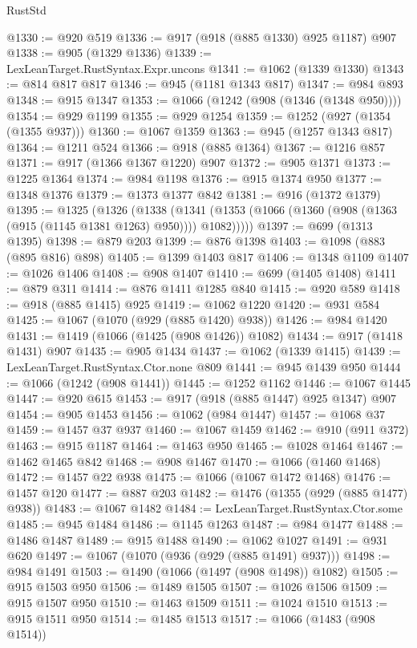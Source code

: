 \begin{lexlean}{RustStd}
\begin{coremodule}
@1330 := @920 @519
@1336 := @917 (@918 (@885 @1330) @925 @1187) @907
@1338 := @905 (@1329 @1336)
@1339 := LexLeanTarget.RustSyntax.Expr.uncons
@1341 := @1062 (@1339 @1330)
@1343 := @814 @817 @817
@1346 := @945 (@1181 @1343 @817)
@1347 := @984 @893
@1348 := @915 @1347
@1353 := @1066 (@1242 (@908 (@1346 (@1348 @950))))
@1354 := @929 @1199
@1355 := @929 @1254
@1359 := @1252 (@927 (@1354 (@1355 @937)))
@1360 := @1067 @1359
@1363 := @945 (@1257 @1343 @817)
@1364 := @1211 @524
@1366 := @918 (@885 @1364)
@1367 := @1216 @857
@1371 := @917 (@1366 @1367 @1220) @907
@1372 := @905 @1371
@1373 := @1225 @1364
@1374 := @984 @1198
@1376 := @915 @1374 @950
@1377 := @1348 @1376
@1379 := @1373 @1377 @842
@1381 := @916 (@1372 @1379)
@1395 := @1325
    (@1326
      (@1338 (@1341 (@1353 (@1066 (@1360 (@908 (@1363 (@915 (@1145 @1381 @1263) @950)))) @1082)))))
@1397 := @699 (@1313 @1395)
@1398 := @879 @203
@1399 := @876 @1398
@1403 := @1098 (@883 (@895 @816) @898)
@1405 := @1399 @1403 @817
@1406 := @1348 @1109
@1407 := @1026 @1406
@1408 := @908 @1407
@1410 := @699 (@1405 @1408)
@1411 := @879 @311
@1414 := @876 @1411 @1285 @840
@1415 := @920 @589
@1418 := @918 (@885 @1415) @925
@1419 := @1062 @1220
@1420 := @931 @584
@1425 := @1067 (@1070 (@929 (@885 @1420) @938))
@1426 := @984 @1420
@1431 := @1419 (@1066 (@1425 (@908 @1426)) @1082)
@1434 := @917 (@1418 @1431) @907
@1435 := @905 @1434
@1437 := @1062 (@1339 @1415)
@1439 := LexLeanTarget.RustSyntax.Ctor.none @809
@1441 := @945 @1439 @950
@1444 := @1066 (@1242 (@908 @1441))
@1445 := @1252 @1162
@1446 := @1067 @1445
@1447 := @920 @615
@1453 := @917 (@918 (@885 @1447) @925 @1347) @907
@1454 := @905 @1453
@1456 := @1062 (@984 @1447)
@1457 := @1068 @37
@1459 := @1457 @37 @937
@1460 := @1067 @1459
@1462 := @910 (@911 @372)
@1463 := @915 @1187
@1464 := @1463 @950
@1465 := @1028 @1464
@1467 := @1462 @1465 @842
@1468 := @908 @1467
@1470 := @1066 (@1460 @1468)
@1472 := @1457 @22 @938
@1475 := @1066 (@1067 @1472 @1468)
@1476 := @1457 @120
@1477 := @887 @203
@1482 := @1476 (@1355 (@929 (@885 @1477) @938))
@1483 := @1067 @1482
@1484 := LexLeanTarget.RustSyntax.Ctor.some
@1485 := @945 @1484
@1486 := @1145 @1263
@1487 := @984 @1477
@1488 := @1486 @1487
@1489 := @915 @1488
@1490 := @1062 @1027
@1491 := @931 @620
@1497 := @1067 (@1070 (@936 (@929 (@885 @1491) @937)))
@1498 := @984 @1491
@1503 := @1490 (@1066 (@1497 (@908 @1498)) @1082)
@1505 := @915 @1503 @950
@1506 := @1489 @1505
@1507 := @1026 @1506
@1509 := @915 @1507 @950
@1510 := @1463 @1509
@1511 := @1024 @1510
@1513 := @915 @1511 @950
@1514 := @1485 @1513
@1517 := @1066 (@1483 (@908 @1514))

\end{coremodule}
\end{lexlean}
